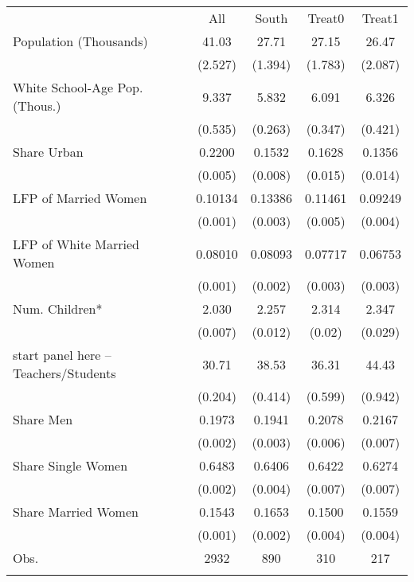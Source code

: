 \begin{tabular}{lcccc}
\hhline{=====}
&
All & South & Treat0 & Treat1\\
Population (Thousands) & 41.03 & 27.71 & 27.15 & 26.47\\
&
(2.527) & (1.394) & (1.783) & (2.087)\\
White School-Age Pop. (Thous.) & 9.337 & 5.832 & 6.091 & 6.326\\
&
(0.535) & (0.263) & (0.347) & (0.421)\\
Share Urban & 0.2200 & 0.1532 & 0.1628 & 0.1356\\
&
(0.005) & (0.008) & (0.015) & (0.014)\\
LFP of Married Women & 0.10134 & 0.13386 & 0.11461 & 0.09249\\
&
(0.001) & (0.003) & (0.005) & (0.004)\\
LFP of White Married Women & 0.08010 & 0.08093 & 0.07717 & 0.06753\\
&
(0.001) & (0.002) & (0.003) & (0.003)\\
Num. Children* & 2.030 & 2.257 & 2.314 & 2.347\\
&
(0.007) & (0.012) & (0.02) & (0.029)\\
start panel here -- Teachers/Students & 30.71 & 38.53 & 36.31 & 44.43\\
&
(0.204) & (0.414) & (0.599) & (0.942)\\
Share Men & 0.1973 & 0.1941 & 0.2078 & 0.2167\\
&
(0.002) & (0.003) & (0.006) & (0.007)\\
Share Single Women & 0.6483 & 0.6406 & 0.6422 & 0.6274\\
&
(0.002) & (0.004) & (0.007) & (0.007)\\
Share Married Women & 0.1543 & 0.1653 & 0.1500 & 0.1559\\
&
(0.001) & (0.002) & (0.004) & (0.004)\\
Obs.
&
2932 & 890 & 310 & 217\\
\hhline{-----}
\end{tabular}
